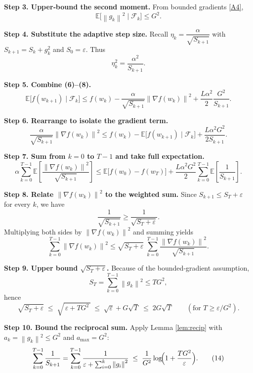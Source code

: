 \documentclass{article}
\newcommand{\E}{\mathbb{E}}
\newcommand{\norm}[1]{\left\lVert#1\right\rVert}
\begin{document}
\noindent\textbf{Step 3. Upper‑bound the second moment.}  
From bounded gradients \eqref{A4},
\[
\E\!\big[\norm{g_k}^{2}\mid\mathcal{F}_k\big]\le G^{2}.
\tag{7}
\]

\noindent\textbf{Step 4. Substitute the adaptive step size.}  
Recall $\eta_k=\dfrac{\alpha}{\sqrt{S_{k+1}}}$ with $S_{k+1}=S_{k}+g_k^{2}$ and $S_0=\varepsilon$. Thus
\[
\eta_k^{2}= \frac{\alpha^{2}}{S_{k+1}}.
\tag{8}
\]

\noindent\textbf{Step 5. Combine (6)–(8).}
\[
\E\!\big[f(w_{k+1})\mid\mathcal{F}_k\big]
\le f(w_k)-\frac{\alpha}{\sqrt{S_{k+1}}}\norm{\nabla f(w_k)}^{2}
+\frac{L\alpha^{2}}{2}\frac{G^{2}}{S_{k+1}}.
\tag{9}
\]

\noindent\textbf{Step 6. Rearrange to isolate the gradient term.}
\[
\frac{\alpha}{\sqrt{S_{k+1}}}\norm{\nabla f(w_k)}^{2}
\le f(w_k)-\E\!\big[f(w_{k+1})\mid\mathcal{F}_k\big]
+\frac{L\alpha^{2}G^{2}}{2S_{k+1}}.
\tag{10}
\]

\noindent\textbf{Step 7. Sum from $k=0$ to $T-1$ and take full expectation.}
\[
\alpha\sum_{k=0}^{T-1}\E\!\left[\frac{\norm{\nabla f(w_k)}^{2}}{\sqrt{S_{k+1}}}\right]
\le \E\!\big[f(w_0)-f(w_T)\big]
+\frac{L\alpha^{2}G^{2}}{2}\sum_{k=0}^{T-1}\E\!\left[\frac{1}{S_{k+1}}\right].
\tag{11}
\]

\noindent\textbf{Step 8. Relate $\norm{\nabla f(w_k)}^{2}$ to the weighted sum.}  
Since $S_{k+1}\le S_T+\varepsilon$ for every $k$, we have
\[
\frac{1}{\sqrt{S_{k+1}}}\ge\frac{1}{\sqrt{S_T+\varepsilon}}.
\]
Multiplying both sides by $\norm{\nabla f(w_k)}^{2}$ and summing yields
\[
\sum_{k=0}^{T-1}\norm{\nabla f(w_k)}^{2}
\le \sqrt{S_T+\varepsilon}\;
\sum_{k=0}^{T-1}\frac{\norm{\nabla f(w_k)}^{2}}{\sqrt{S_{k+1}}}.
\tag{12}
\]

\noindent\textbf{Step 9. Upper bound $\sqrt{S_T+\varepsilon}$.}  
Because of the bounded‑gradient assumption,
\[
S_T=\sum_{k=0}^{T-1}\norm{g_k}^{2}\le T G^{2},
\]
hence
\[
\sqrt{S_T+\varepsilon}\;\le\;\sqrt{\,\varepsilon+T G^{2}\,}
\;\le\;\sqrt{\varepsilon}+G\sqrt{T}
\;\le\;2G\sqrt{T}\qquad(\text{for }T\ge \varepsilon/G^{2}).
\tag{13}
\]

\noindent\textbf{Step 10. Bound the reciprocal sum.}  
Apply Lemma \ref{lem:recip} with $a_k=\norm{g_k}^{2}\le G^{2}$ and $a_{\max}=G^{2}$:
\[
\sum_{k=0}^{T-1}\frac{1}{S_{k+1}}
=\sum_{k=0}^{T-1}\frac{1}{\varepsilon+\sum_{i=0}^{k}\norm{g_i}^{2}}
\;\le\;
\frac{1}{G^{2}}\log\!\Bigl(1+\frac{T G^{2}}{\varepsilon}\Bigr).
\tag{14}
\]
\end{document}
